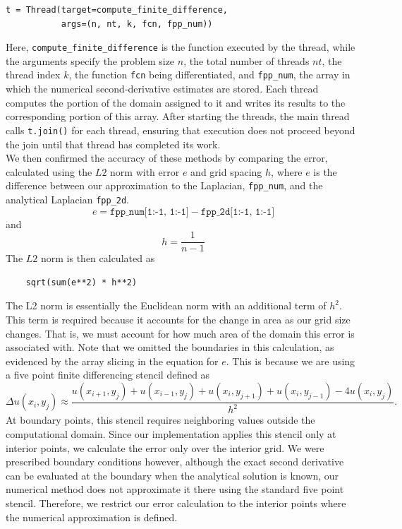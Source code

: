\documentclass[12pt]{article}
\begin{document}
\begin{verbatim}
t = Thread(target=compute_finite_difference,
           args=(n, nt, k, fcn, fpp_num))
\end{verbatim}

Here, \texttt{compute\_finite\_difference} is the function executed by the thread, while the arguments specify the problem size $n$, the total number of threads $nt$, the thread index $k$, the function \texttt{fcn} being differentiated, and \texttt{fpp\_num}, the array in which the numerical second-derivative estimates are stored. Each thread computes the portion of the domain assigned to it and writes its results to the corresponding portion of this array. After starting the threads, the main thread calls \texttt{t.join()} for each thread, ensuring that execution does not proceed beyond the join until that thread has completed its work.
\\
We then confirmed the accuracy of these methods by comparing the error, calculated using the $L2$ norm with error $e$ and grid spacing $h$, where $e$ is the difference between our approximation to the Laplacian, \texttt{fpp\_num}, and the analytical Laplacian \texttt{fpp\_2d}.
\begin{equation}
    e = \texttt{fpp\_num[1:-1, 1:-1]} - \texttt{fpp\_2d[1:-1, 1:-1]}
\end{equation} 
and 
\begin{equation}
    h = \frac{1}{n-1}
\end{equation}
The $L2$ norm is then calculated as 
\begin{verbatim}
    sqrt(sum(e**2) * h**2)
\end{verbatim}
The L2 norm is essentially the Euclidean norm with an additional term of $h^2$. This term is required because it accounts for the change in area as our grid size changes. That is, we must account for how much area of the domain this error is associated with. Note that we omitted the boundaries in this calculation, as evidenced by the array slicing in the equation for $e$. This is because we are using a five point finite differencing stencil defined as 
\[
\Delta u(x_i,y_j) \approx
\frac{
u(x_{i+1},y_j) + u(x_{i-1},y_j)
+ u(x_i,y_{j+1}) + u(x_i,y_{j-1})
- 4u(x_i,y_j)
}{h^2}.
\]
At boundary points, this stencil requires neighboring values outside the computational domain. Since our implementation applies this stencil only at interior points, we calculate the error only over the interior grid. We were prescribed boundary conditions however, although the exact second derivative can be evaluated at the boundary when the analytical solution is known, our numerical method does not approximate it there using the standard five point stencil. Therefore, we restrict our error calculation to the interior points where the numerical approximation is defined.
\end{document}
